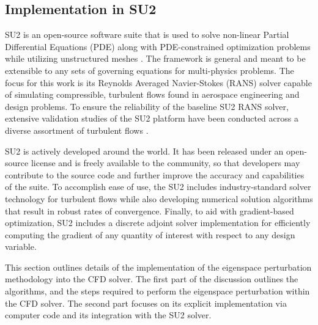\subsection{Implementation in SU2}

SU2 is an open-source software suite that is used to solve non-linear Partial Differential Equations (PDE) along with PDE-constrained optimization problems while utilizing unstructured meshes \cite{su21}. The framework is general and meant to be extensible to any sets of governing equations for multi-physics problems. The focus for this work is its Reynolds Averaged Navier-Stokes (RANS) solver capable of simulating compressible, turbulent flows found in aerospace engineering and design problems. To ensure the reliability of the baseline SU2 RANS solver, extensive validation studies of the SU2 platform have been conducted across a diverse assortment of turbulent flows \cite{su22}. 

SU2 is actively developed around the world. It has been released under an open-source license and is freely available to the community, so that developers may contribute to the source code and further improve the accuracy and capabilities of the suite. To accomplish ease of use, the SU2 includes industry-standard solver technology for turbulent flows while also developing numerical solution algorithms that result in robust rates of convergence. Finally, to aid with gradient-based optimization, SU2 includes a discrete adjoint solver implementation for efficiently computing the gradient of any quantity of interest with respect to any design variable.

This section outlines details of the implementation of the eigenspace perturbation methodology into the CFD solver. The first part of the discussion outlines the algorithms, and the steps required to perform the eigenspace perturbation within the CFD solver. The second part focuses on its explicit implementation via computer code and its integration with the SU2 solver. 

